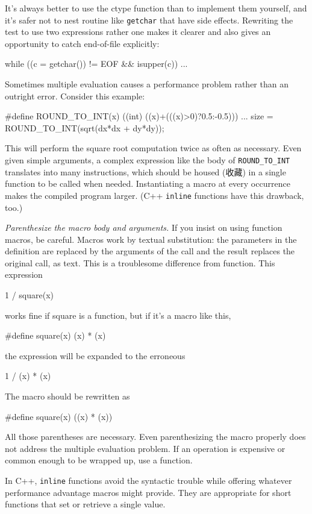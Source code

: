 It's always better to use the ctype function than to implement them
yourself, and it's safer not to nest routine like \verb'getchar' that have
side effects. Rewriting the test to use two expressions rather one makes it
clearer and also gives an opportunity to catch end-of-file explicitly:
\begin{wellcode}
    while ((c = getchar()) != EOF && isupper(c))
        ...
\end{wellcode}

Sometimes multiple evaluation causes a performance problem rather than an
outright error. Consider this example:
\begin{badcode}
    #define ROUND_TO_INT(x) ((int) ((x)+(((x)>0)?0.5:-0.5)))
        ...
    size = ROUND_TO_INT(sqrt(dx*dx + dy*dy));
\end{badcode}
This will perform the square root computation twice as often as necessary.
Even given simple arguments, a complex expression like the body of
\verb'ROUND_TO_INT' translates into many instructions, which should be
housed (收藏) in a single function to be called when needed. Instantiating a
macro at every occurrence makes the compiled program larger. (C++
\verb'inline' functions have this drawback, too.)

\emph{Parenthesize the macro body and arguments.} If you insist on using
function macros, be careful. Macros work by textual substitution: the
parameters in the definition are replaced by the arguments of the call and
the result replaces the original call, as text. This is a troublesome
difference from function. This expression
\begin{wellcode}
    1 / square(x)
\end{wellcode}
works fine if square is a function, but if it's a macro like this,
\begin{badcode}
    #define square(x) (x) * (x)
\end{badcode}
the expression will be expanded to the erroneous
\begin{badcode}
    1 / (x) * (x)
\end{badcode}
The macro should be rewritten as 
\begin{wellcode}
    #define square(x) ((x) * (x))
\end{wellcode}
All those parentheses are necessary. Even parenthesizing the macro properly
does not address the multiple evaluation problem. If an operation is
expensive or common enough to be wrapped up, use a function.

In C++, \verb'inline' functions avoid the syntactic trouble while offering
whatever performance advantage macros might provide. They are appropriate
for short functions that set or retrieve a single value.

